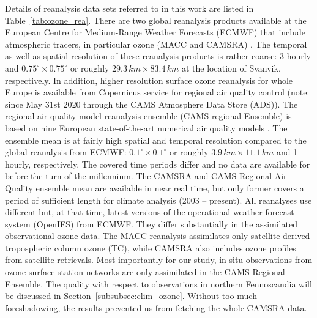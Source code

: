 \documentclass[bg, manuscript]{copernicus}
\begin{document}
Details of reanalysis data sets referred to in this work are listed in Table~\ref{tab:ozone_rea}.
There are two global reanalysis products available at the European Centre for Medium-Range Weather Forecasts (ECMWF) that include atmospheric tracers, in particular ozone (MACC and CAMSRA) \citep{ACP:Inness2013, ACP:Inness2019}. The temporal as well as spatial resolution of these reanalysis products is rather coarse: 3-hourly and $0.75^\circ\times 0.75^\circ$ or roughly $29.3\,\unit{km}\times 83.4\,\unit{km}$ at the location of Svanvik, respectively. In addition, higher resolution surface ozone reanalysis for whole Europe is available from Copernicus service for regional air quality control (note: since May 31st 2020 through the CAMS Atmosphere Data Store (ADS)). The regional air quality model reanalysis ensemble (CAMS regional Ensemble) is based on nine European state-of-the-art numerical air quality models \citep{Copernicus_Regio_AIRQ}. The ensemble mean is at fairly high spatial and temporal resolution compared to the global reanalysis from ECMWF: $0.1^\circ\times 0.1^\circ$ or roughly $3.9\,\unit{km}\times 11.1\,\unit{km}$ and 1-hourly, respectively. The covered time periods differ and no data are available for before the turn of the millennium. The CAMSRA and CAMS Regional Air Quality ensemble mean are available in near real time, but only former covers a period of sufficient length for climate analysis (2003 -- present). All reanalyses use different but, at that time, latest versions of the operational weather forecast system (OpenIFS) from ECMWF. They differ substantially in the assimilated observational ozone data. The MACC reanalysis assimilates only satellite derived tropospheric column ozone (TC), while CAMSRA also includes ozone profiles from satellite retrievals. Most importantly for our study, in situ observations from ozone surface station networks are only assimilated in the CAMS Regional Ensemble. The quality with respect to observations in northern Fennoscandia will be discussed in Section~\ref{subsubsec:clim_ozone}. Without too much foreshadowing, the results prevented us from fetching the whole CAMSRA data.
\end{document}
